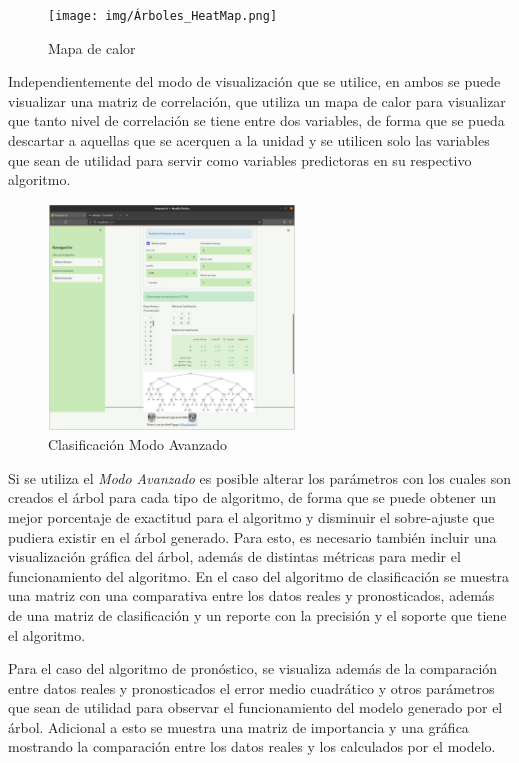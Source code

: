 \documentclass[10pt]{article}
\begin{document}
    \begin{figure}[H]
    \centering
    \texttt{[image: img/Árboles\_HeatMap.png]} 
    \caption{Mapa de calor}
    \label{fig:ArbolHM}
    \end{figure}
    
    Independientemente del modo de visualización que se utilice, en ambos se puede visualizar una matriz de correlación, que utiliza un mapa de calor para visualizar que tanto nivel de correlación se tiene entre dos variables, de forma que se pueda descartar a aquellas que se acerquen a la unidad y se utilicen solo las variables que sean de utilidad para servir como variables predictoras en su respectivo algoritmo.
    
    \begin{figure}[H]
    \centering
    \includegraphics[height=6cm]{img/ÁrbolesClasificaciónMA.png} 
    \caption{Clasificación Modo Avanzado}
    \label{fig:ArbolMAc}
    \end{figure}
    
    Si se utiliza el \textit{Modo Avanzado} es posible alterar los parámetros con los cuales son creados el árbol para cada tipo de algoritmo, de forma que se puede obtener un mejor porcentaje de exactitud para el algoritmo y disminuir el sobre-ajuste que pudiera existir en el árbol generado. Para esto, es necesario también incluir una visualización gráfica del árbol, además de distintas métricas para medir el funcionamiento del algoritmo. En el caso del algoritmo de clasificación se muestra una matriz con una comparativa entre los datos reales y pronosticados, además de una matriz de clasificación y un reporte con la precisión y el soporte que tiene el algoritmo.\newline
    
    Para el caso del algoritmo de pronóstico, se visualiza además de la comparación entre datos reales y pronosticados el error medio cuadrático y otros parámetros que sean de utilidad para observar el funcionamiento del modelo generado por el árbol. Adicional a esto se muestra una matriz de importancia y una gráfica mostrando la comparación entre los datos reales y los calculados por el modelo.
    
\end{document}
